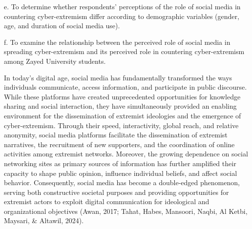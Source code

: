 \documentclass[10pt]{NSP1}
\begin{document}
e. To determine whether respondents' perceptions of the role of social media in countering cyber-extremism differ according to demographic variables (gender, age, and duration of social media use).

f. To examine the relationship between the perceived role of social media in spreading cyber-extremism and its perceived role in countering cyber-extremism among Zayed University students.

\par\medskip{}\smallskip

\par\medskip{}\smallskip

In today's digital age, social media has fundamentally transformed the ways individuals communicate, access information, and participate in public discourse. While these platforms have created unprecedented opportunities for knowledge sharing and social interaction, they have simultaneously provided an enabling environment for the dissemination of extremist ideologies and the emergence of cyber-extremism. Through their speed, interactivity, global reach, and relative anonymity, social media platforms facilitate the dissemination of extremist narratives, the recruitment of new supporters, and the coordination of online activities among extremist networks. Moreover, the growing dependence on social networking sites as primary sources of information has further amplified their capacity to shape public opinion, influence individual beliefs, and affect social behavior. Consequently, social media has become a double-edged phenomenon, serving both constructive societal purposes and providing opportunities for extremist actors to exploit digital communication for ideological and organizational objectives (Awan, 2017; Tahat, Habes, Mansoori, Naqbi, Al Ketbi, Maysari, \& Altawil, 2024).
\end{document}
